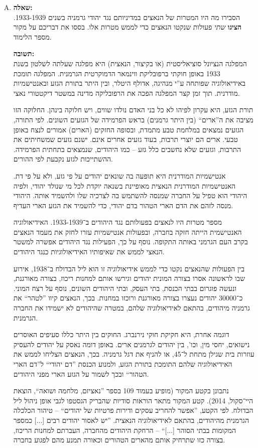 \documentclass[a4paper]{article}
\begin{document}
\begin{enumerate}[A.]
			
			\item \textbf{שאלה: }\\
			הסבירו מה היו המטרות של הנאצים במדיניותם נגד יהודי גרמניה בשנים 1933-1939. \textbf{הציגו} \textit{שתי} פעולות שנקטו הנאצים כדי לממש מטרות אלו. בססו את דבריכם על מקור מספר הלימוד. 
			
			\textbf{תשובה: }\\
			המפלגה הנציונל סוציאליסטית (או בקיצור, הנאצית) היא מפלגה שעלתה לשלטון בשנת 1933 באופן חוקתי ברפובליקת ווינמאר הדמוקרטית הגרמנית. המפלגה תומכת באידיאולוגיה שפותחה ע''י מנהיגה, אדולף היטלר, ובין היתר בתורת הגזע ובאנטישמיות מודרנית. תוך זמן קצר המפלגה הפכה את הרפובליקה מדינה במשטר דיקטטורי נאצי. 
			
			תורת הגזע, היא עקרון לפיהו לא כל בני האדם נולדו שווים, ויש חלוקה בינהן. החלוקה הזו מציבה את ה''ארים`` (בין היתר גרמנים) בראש הפרמידה של הגזעים השונים. לפי התורה, הגזעים נמצאים במלחמת טבע מתמדת, ובסופה החזקים (הארים) אמורים לנצח באופן טבעי. ארים הם יוצרי תרבות, בעוד גזעים אחרים אינם. ישנם גזעים שמשחיתים את התרבות, וגזעים שלא נחשבים כלל גזע – כמו היהודים, שנמצאים בתחתית הפרמידה. ההשתייכות לגזע נקבעת לפי ההורים. 
			
			אנטישמיות המודרנית היא תופעה בה שונאים יהודים על פי גזע, ולא על פי דת. האנטישמיות המודרנית הנאצית מאופיינת בשנאה יוקדת לכל מי שנולד יהודי, ולפיה היהודי הוא טפיל על החברה שמנסה להשתמש בה לצרכיה שלו ולהשמיד אותה. היהודי מנסה לזהם את הדם הארי הטהור בדם יהודי, כדי להשמיד את הגזע הארי העדיף. 
			
			מספר מטרות היו לנאצים בפעולותם נגד היהודים ב־1933-1939. האידיאולוגיה האנטישמית הייתה חזקה בחברה, ובפעולות אנטישמיות עזרו לחזק את מעמד הנאצים בקרב העם הגרמני באותה התקופה. נוסף על כך, הפעילות נגד היהודים אפשרה למשטר הנאצי לממש את שאיפותיו האידיאולוגיות כנגד היהודים. 
			
			בין הפעולות שהנאצים נקטו כדי לממש אידיאולוגיה זו הוא ליל הבדולח ב־1938, אירוע שבו לראשונה אסרו בצורה המונית יהודים וגירשו אותם למחנות ריכוז, בצורה מאורגנת, ונעשה פוגרום בבתי הכנסת, בתי העסק, ובתי היהודים השונים, נוסף על רצח המוני. כ־30000 יהודים נעצרו בצורה מאורגנת ורוכזו במחנות. בכך, הנאצים קיוו ''לטהר`` את גרמניה מיהודים, בהתאם לאידיאולוגיה שלהם, במטרה שהיהודים לא ישמידו את החברה הגרמנית. 
			
			דוגמה אחרת, היא חקיקת חוקי נירנברג. החוקים בין היתר כללו סעיפים האוסרים נישואים, יחסי מין, וכו', בין יהודים לגרמנים ארים. באופן דומה נאסק על יהודים להעסיק עוזרות בית שגילן מתחת ל־45, או להניף את דגל גרמניה. בכך, הנאצים הצליחו לממש את האידיאולוגיה שלהם התומכת בתורת הגזע, ולמנוע הכנסת ''דם יהודי`` ל''דם הארי הטהור`` ובכך לשמור על הגזע הארי מפני היהודים. 
			
			נתבונן בקטע המקור (מופיע בעמוד 109 בספר ''נאציזם, מלחמה ושואה``, הוצאת היי־סקול, 2014). קטע המקור מתאר הוראות סודיות שהבריק הגסטפו לגבי אופן ניהול ליל הבדולח. לפי הקטע, ''אפשר להחריב עסקים ודירות פרטיות של יהודים`` – טיהור הכלכלה הגרמנית מהיהודים, בהתאם לאידיאולוגיה הנאצית. ''יש לאסור יהודים רבים [...] כמספר המקומות בבתי הסוהר [...]`` – הרחקת היהודים מהחברה, העברתם למחנות הריכוז, בצורה כזו שתרחיק אותם מהארים הטהורים וכאורה תמנע מהם לפגוע בחברה. 
			
			
		\end{enumerate}
\end{document}
